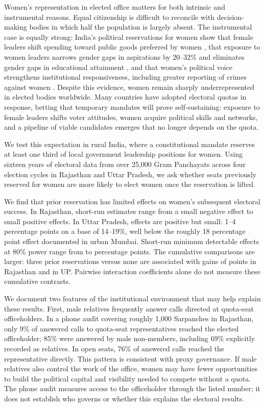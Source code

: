 \documentclass[12pt]{article}
\begin{document}
Women's representation in elected office matters for both intrinsic and instrumental reasons. Equal citizenship is difficult to reconcile with decision-making bodies in which half the population is largely absent. The instrumental case is equally strong: India's political reservations for women show that female leaders shift spending toward public goods preferred by women \citep{chattopadhyay2004women}, that exposure to women leaders narrows gender gaps in aspirations by 20--32\% and eliminates gender gaps in educational attainment \citep{beaman2012female}, and that women's political voice strengthens institutional responsiveness, including greater reporting of crimes against women \citep{iyer2012power}. Despite this evidence, women remain sharply underrepresented in elected bodies worldwide. Many countries have adopted electoral quotas in response, betting that temporary mandates will prove self-sustaining: exposure to female leaders shifts voter attitudes, women acquire political skills and networks, and a pipeline of viable candidates emerges that no longer depends on the quota.

We test this expectation in rural India, where a constitutional mandate reserves at least one third of local government leadership positions for women. Using sixteen years of electoral data from over 25,000 Gram Panchayats across four election cycles in Rajasthan and Uttar Pradesh, we ask whether seats previously reserved for women are more likely to elect women once the reservation is lifted.

We find that prior reservation has limited effects on women's subsequent electoral success. In Rajasthan, short-run estimates range from a small negative effect to small positive effects. In Uttar Pradesh, effects are positive but small: 1--4 percentage points on a base of 14--19\%, well below the roughly 18 percentage point effect \citet{bhavnani2009electoral} documented in urban Mumbai. Short-run minimum detectable effects at 80\% power range from \shortMdeMin{} to \shortMdeMax{} percentage points. The cumulative comparisons are larger: three prior reservations versus none are associated with gains of \rajFullAlways{} points in Rajasthan and \upFullAlways{} in UP. Pairwise interaction coefficients alone do not measure these cumulative contrasts.

We document two features of the institutional environment that may help explain these results. First, male relatives frequently answer calls directed at quota-seat officeholders. In a phone audit covering roughly 1,000 Sarpanches in Rajasthan, only 9\% of answered calls to quota-seat representatives reached the elected officeholder; 85\% were answered by male non-members, including 69\% explicitly recorded as relatives. In open seats, 76\% of answered calls reached the representative directly. This pattern is consistent with proxy governance. If male relatives also control the work of the office, women may have fewer opportunities to build the political capital and visibility needed to compete without a quota. The phone audit measures access to the officeholder through the listed number; it does not establish who governs or whether this explains the electoral results.
\end{document}

